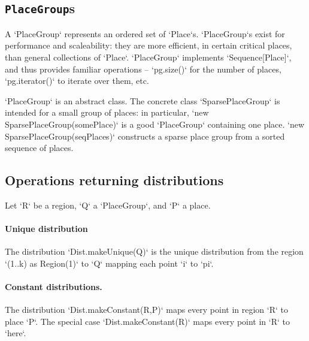 \subsection{{\tt PlaceGroup}s}

A \xcd`PlaceGroup` represents an ordered set of \xcd`Place`s.
\xcd`PlaceGroup`s exist for performance and scaleability: they are more
efficient, in certain critical places, than general collections of
\xcd`Place`. \xcd`PlaceGroup` implements \xcd`Sequence[Place]`, and thus
provides familiar operations -- \xcd`pg.size()` for the number of places,
\xcd`pg.iterator()` to iterate over them, etc.  

\xcd`PlaceGroup` is an abstract class.  The concrete class
\xcd`SparsePlaceGroup` is intended for a small group of places: 
in particular, 
\xcd`new SparsePlaceGroup(somePlace)` is a good \xcd`PlaceGroup` containing
one place.  
\xcd`new SparsePlaceGroup(seqPlaces)`
constructs a sparse place group from a sorted sequence of places.

\subsection{Operations returning distributions}



Let \xcd`R` be a region, \xcd`Q` 
a \xcd`PlaceGroup`, and \xcd`P` a place.

\paragraph{Unique distribution} 
The distribution \xcd`Dist.makeUnique(Q)` is the unique distribution from the
region \xcd`(1..k) as Region(1)` to \xcd`Q` mapping each point \xcd`i` to
\xcd`pi`.


\paragraph{Constant distributions.} 
The distribution \xcd`Dist.makeConstant(R,P)` maps every point in region
\xcd`R` to place \xcd`P`.  
The special case \xcd`Dist.makeConstant(R)` maps every point in \xcd`R` to
\xcd`here`. 


